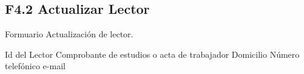 \subsection{F4.2 Actualizar Lector }
  Formuario Actualización de lector.\\

	\begin{UClist}
      \UCli Id del Lector
      \UCli Comprobante de estudios o acta de trabajador
      \UCli Domicilio
      \UCli Número telefónico
      \UCli e-mail
    \end{UClist}





